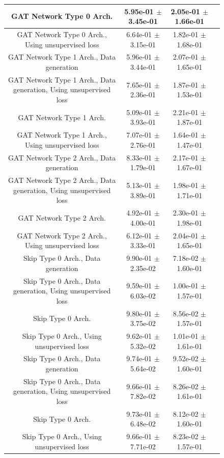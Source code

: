 \documentclass[a4paper]{article}
\begin{document}
\begin{figure}[H]
{\begin{tabular}{|c|c|c|c|}
GAT Network Type 0 Arch.   & 5.95e-01 $\pm$ 3.45e-01 & 2.05e-01 $\pm$ 1.66e-01 \\ \hline
GAT Network Type 0 Arch., Using unsupervised loss   & 6.64e-01 $\pm$ 3.15e-01 & 1.82e-01 $\pm$ 1.68e-01 \\ \hline
GAT Network Type 1 Arch., Data generation   & 5.96e-01 $\pm$ 3.44e-01 & 2.07e-01 $\pm$ 1.65e-01 \\ \hline
GAT Network Type 1 Arch., Data generation, Using unsupervised loss   & 7.65e-01 $\pm$ 2.36e-01 & 1.87e-01 $\pm$ 1.53e-01 \\ \hline
GAT Network Type 1 Arch.   & 5.09e-01 $\pm$ 3.93e-01 & 2.21e-01 $\pm$ 1.87e-01 \\ \hline
GAT Network Type 1 Arch., Using unsupervised loss   & 7.07e-01 $\pm$ 2.76e-01 & 1.64e-01 $\pm$ 1.47e-01 \\ \hline
GAT Network Type 2 Arch., Data generation   & 8.33e-01 $\pm$ 1.79e-01 & 2.17e-01 $\pm$ 1.67e-01 \\ \hline
GAT Network Type 2 Arch., Data generation, Using unsupervised loss   & 5.13e-01 $\pm$ 3.89e-01 & 1.98e-01 $\pm$ 1.71e-01 \\ \hline
GAT Network Type 2 Arch.   & 4.92e-01 $\pm$ 4.00e-01 & 2.30e-01 $\pm$ 1.98e-01 \\ \hline
GAT Network Type 2 Arch., Using unsupervised loss   & 6.12e-01 $\pm$ 3.33e-01 & 2.04e-01 $\pm$ 1.65e-01 \\ \hline
Skip Type 0 Arch., Data generation   & 9.90e-01 $\pm$ 2.35e-02 & 7.18e-02 $\pm$ 1.60e-01 \\ \hline
Skip Type 0 Arch., Data generation, Using unsupervised loss   & 9.59e-01 $\pm$ 6.03e-02 & 1.00e-01 $\pm$ 1.57e-01 \\ \hline
Skip Type 0 Arch.   & 9.80e-01 $\pm$ 3.75e-02 & 8.56e-02 $\pm$ 1.57e-01 \\ \hline
Skip Type 0 Arch., Using unsupervised loss   & 9.62e-01 $\pm$ 5.32e-02 & 1.01e-01 $\pm$ 1.61e-01 \\ \hline
Skip Type 0 Arch., Data generation   & 9.74e-01 $\pm$ 5.64e-02 & 9.52e-02 $\pm$ 1.60e-01 \\ \hline
Skip Type 0 Arch., Data generation, Using unsupervised loss   & 9.66e-01 $\pm$ 7.82e-02 & 8.26e-02 $\pm$ 1.61e-01 \\ \hline
Skip Type 0 Arch.   & 9.73e-01 $\pm$ 6.48e-02 & 8.12e-02 $\pm$ 1.60e-01 \\ \hline
Skip Type 0 Arch., Using unsupervised loss   & 9.66e-01 $\pm$ 7.71e-02 & 8.23e-02 $\pm$ 1.57e-01 \\ \hline

\end{tabular}}
\end{figure}
\end{document}
